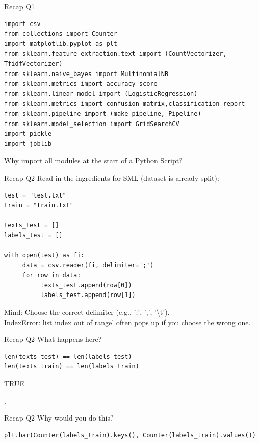 \documentclass[handout]{beamer}
\begin{document}
\begin{frame}[fragile]{Recap Q1}
	
\begin{lstlisting}
import csv
from collections import Counter
import matplotlib.pyplot as plt
from sklearn.feature_extraction.text import (CountVectorizer, TfidfVectorizer)
from sklearn.naive_bayes import MultinomialNB
from sklearn.metrics import accuracy_score
from sklearn.linear_model import (LogisticRegression)
from sklearn.metrics import confusion_matrix,classification_report
from sklearn.pipeline import (make_pipeline, Pipeline)
from sklearn.model_selection import GridSearchCV
import pickle
import joblib
\end{lstlisting}
	
Why import all modules at the start of a Python Script?
\end{frame}


\begin{frame}[fragile]{Recap Q2}
Read in the ingredients for SML (dataset is already split):
\begin{lstlisting}
test = "test.txt"
train = "train.txt"

texts_test = []
labels_test = []

with open(test) as fi:
     data = csv.reader(fi, delimiter=';')
     for row in data:
          texts_test.append(row[0])
          labels_test.append(row[1])

\end{lstlisting}

Mind: Choose the correct delimiter (e.g., ';', ',', '\textbackslash t'). \\
IndexError: list index out of range' often pops up if you choose the wrong one.
\end{frame}


\begin{frame}[fragile]{Recap Q2}
What happens here?
\begin{lstlisting}
len(texts_test) == len(labels_test)
len(texts_train) == len(labels_train)
\end{lstlisting}
	
\begin{lstlistingoutput}
TRUE
\end{lstlistingoutput}.
\end{frame}


\begin{frame}[fragile]{Recap Q2}
Why would you do this?
\begin{lstlisting}
plt.bar(Counter(labels_train).keys(), Counter(labels_train).values())
\end{lstlisting}
	
\end{frame}
\end{document}
